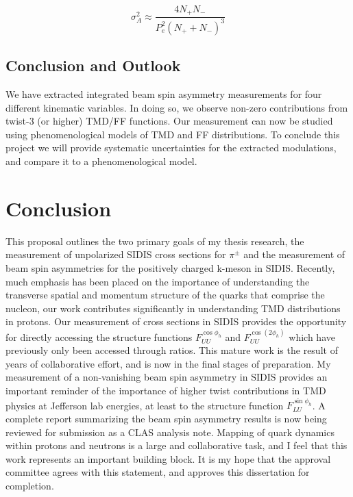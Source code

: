 \begin{equation}
  \sigma_A^2 \approx \frac{4N_+N_-}{P_e^2 (N_+ + N_-)^3} 
\end{equation}

\subsection{Conclusion and Outlook}
We have extracted integrated beam spin asymmetry measurements for four different kinematic variables.  In doing so, we observe non-zero contributions from twist-3 (or higher) TMD/FF functions.  Our measurement can now be studied using phenomenological models of TMD and FF distributions.  To conclude this project we will provide systematic uncertainties for the extracted modulations, and compare it to a phenomenological model.

\section{Conclusion}

This proposal outlines the two primary goals of my thesis research, the measurement of unpolarized SIDIS cross sections for $\pi^{\pm}$ and the measurement of beam spin asymmetries for the positively charged k-meson in SIDIS.  Recently, much emphasis has been placed on the importance of understanding the transverse spatial and momentum structure of the quarks that comprise the nucleon, our work contributes significantly in understanding TMD distributions in protons.  Our measurement of cross sections in SIDIS provides the opportunity for directly accessing the structure functions $F_{UU}^{\cos\phi_h}$ and $F_{UU}^{\cos(2\phi_h)}$ which have previously only been accessed through ratios.  This mature work is the result of years of collaborative effort, and is now in the final stages of preparation.  My measurement of a non-vanishing beam spin asymmetry in SIDIS provides an important reminder of the importance of higher twist contributions in TMD physics at Jefferson lab energies, at least to the structure function $F_{LU}^{\sin\phi_h}$.  A complete report summarizing the beam spin asymmetry results is now being reviewed for submission as a CLAS analysis note.  Mapping of quark dynamics within protons and neutrons is a large and collaborative task, and I feel that this work represents an important building block.  It is my hope that the approval committee agrees with this statement, and approves this dissertation for completion. 
